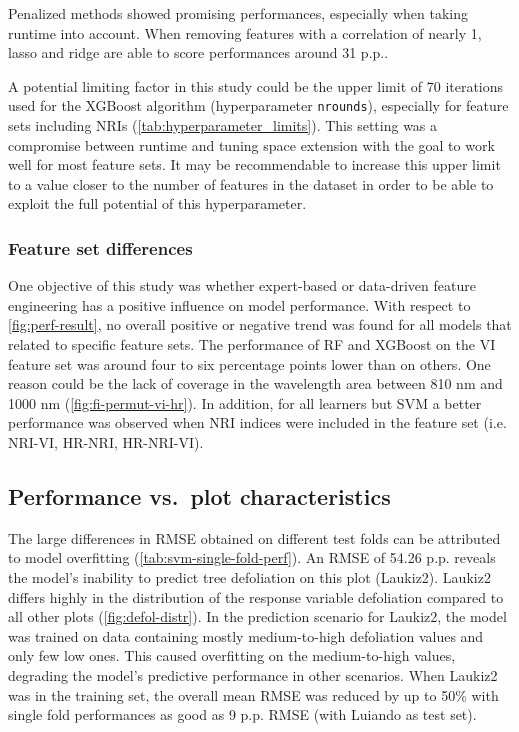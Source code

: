 \documentclass[journal]{IEEEtran}
\begin{document}
Penalized methods showed promising performances, especially when taking runtime into account.
When removing features with a correlation of nearly 1, lasso and ridge are able to score performances around 31 p.p..

A potential limiting factor in this study could be the upper limit of 70 iterations used for the XGBoost algorithm (hyperparameter \texttt{nrounds}), especially for feature sets including NRIs (\autoref{tab:hyperparameter_limits}).
This setting was a compromise between runtime and tuning space extension with the goal to work well for most feature sets.
It may be recommendable to increase this upper limit to a value closer to the number of features in the dataset in order to be able to exploit the full potential of this hyperparameter.

\subsubsection{Feature set differences}

One objective of this study was whether expert-based or data-driven feature engineering has a positive influence on model performance.
With respect to \autoref{fig:perf-result}, no overall positive or negative trend was found for all models that related to specific feature sets.
The performance of RF and XGBoost on the VI feature set was around four to six percentage points lower than on others.
One reason could be the lack of coverage in the wavelength area between 810 nm and 1000 nm (\autoref{fig:fi-permut-vi-hr}).
In addition, for all learners but SVM a better performance was observed when NRI indices were included in the feature set (i.e. NRI-VI, HR-NRI, HR-NRI-VI).

\subsection{Performance vs.\ plot characteristics}
\label{subsec:perf-plot-char}

The large differences in RMSE obtained on different test folds can be attributed to model overfitting (\autoref{tab:svm-single-fold-perf}).
An RMSE of 54.26 p.p. reveals the model's inability to predict tree defoliation on this plot (Laukiz2).
Laukiz2 differs highly in the distribution of the response variable defoliation compared to all other plots (\autoref{fig:defol-distr}).
In the prediction scenario for Laukiz2, the model was trained on data containing mostly medium-to-high defoliation values and only few low ones.
This caused overfitting on the medium-to-high values, degrading the model's predictive performance in other scenarios.
When Laukiz2 was in the training set, the overall mean RMSE was reduced by up to 50\% with single fold performances as good as 9 p.p. RMSE (with Luiando as test set).
\end{document}

